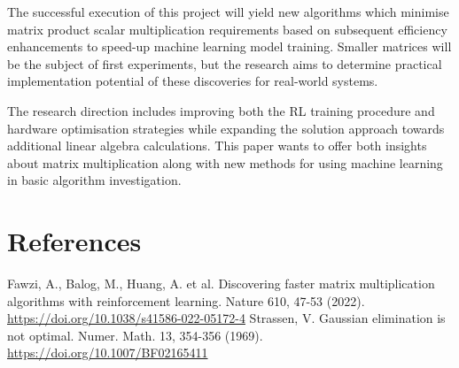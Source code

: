 \documentclass{article}
\begin{document}
The successful execution of this project will yield new algorithms which minimise matrix product scalar multiplication requirements based on subsequent efficiency enhancements to speed-up machine learning model training. Smaller matrices will be the subject of first experiments, but the research aims to determine practical implementation potential of these discoveries for real-world systems.

The research direction includes improving both the RL training procedure and hardware optimisation strategies while expanding the solution approach towards additional linear algebra calculations. This paper wants to offer both insights about matrix multiplication along with new methods for using machine learning in basic algorithm investigation.

\section{References}
\begin{thebibliography}{9}
     Fawzi, A., Balog, M., Huang, A. et al. Discovering faster matrix multiplication algorithms with reinforcement learning. Nature 610, 47-53 (2022). \url{https://doi.org/10.1038/s41586-022-05172-4}
     Strassen, V. Gaussian elimination is not optimal. Numer. Math. 13, 354-356 (1969). \url{https://doi.org/10.1007/BF02165411}
\end{thebibliography}
\end{document}
